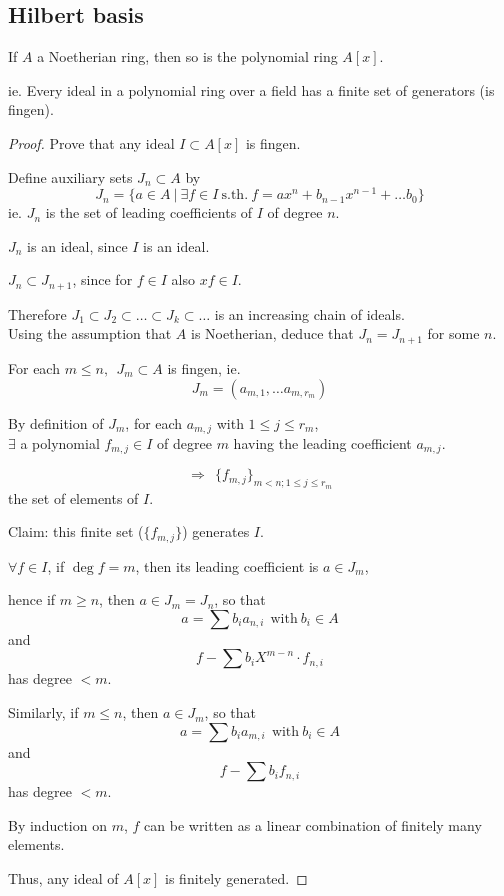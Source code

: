 \documentclass{article}
\theoremstyle{definition}
\newenvironment{thm}[1]
{\renewcommand\theinnerthm{#1}\innerthm}
{\endinnerthm}
\begin{document}
\vspace{0.5cm}
\subsection{Hilbert basis}
\begin{thm}{R.3.6}[Hilbert basis theorem] \label{hilbert-basis}
  If $A$ a Noetherian ring, then so is the polynomial ring $A[x]$.

  ie. Every ideal in a polynomial ring over a field has a finite set of
  generators (is fingen).
\end{thm}
\begin{proof}
  Prove that any ideal $I \subset A[x]$ is fingen.

  Define auxiliary sets $J_n \subset A$ by
  $$J_n = \{ a \in A ~|~ \exists f \in I ~\text{s.th.}~ f = a x^n + b_{n-1}x^{n-1} + \ldots b_0 \}$$
  ie. $J_n$ is the set of leading coefficients of $I$ of degree $n$.

  $J_n$ is an ideal, since $I$ is an ideal.

  $J_n \subset J_{n+1}$, since for $f \in I$ also $x f \in I$.

  Therefore $J_1 \subset J_2 \subset \ldots \subset J_k \subset \ldots$ is an increasing chain of ideals.\\
  Using the assumption that $A$ is Noetherian, deduce that $J_n = J_{n+1}$ for some $n$.

  For each $m \leq n, ~~ J_m \subset A$ is fingen, ie.
  $$J_m = (a_{m,1}, \ldots a_{m, r_m})$$

  By definition of $J_m$, for each $a_{m,j}$ with $1 \leq j \leq r_m$,\\
  $\exists$ a polynomial $f_{m, j} \in I$ of degree $m$ having the leading coefficient $a_{m, j}$.

  $$\Longrightarrow~~ \{ f_{m,j} \}_{m<n; 1 \leq j \leq r_m}$$
  the set of elements of $I$.

  Claim: this finite set ($\{ f_{m,j} \}$) generates $I$.

  $\forall f \in I$, if $\deg f =m$, then its leading coefficient is $a \in J_m$,

  hence if $m \geq n$, then $a \in J_m=J_n$, so that
  $$a = \sum b_i a_{n,i} ~~ \text{with}~ b_i \in A$$
  and
  $$f - \sum b_i X^{m-n} \cdot f_{n, i}$$
  has degree $<m$.

  Similarly, if $m \leq n$, then $a \in J_m$, so that
  $$a = \sum b_i a_{m, i} ~~\text{with}~ b_i \in A$$
  and
  $$f - \sum b_i f_{n, i}$$
  has degree $<m$.


  \vspace{0.3cm}
  By induction on $m$, $f$ can be written as a linear combination of finitely many elements.

  Thus, any ideal of $A[x]$ is finitely generated.
\end{proof}
\end{document}
